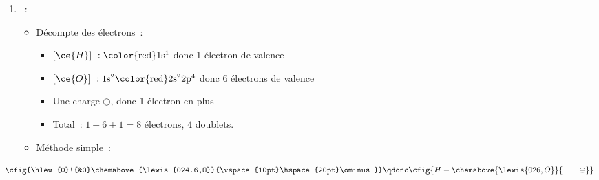 \documentclass[a4paper, 12pt, final, garamond]{book}
\begin{document}
\begin{enumerate}
    \item[]
        \begin{itemize}[label=$\diamond$, leftmargin=10pt]
            ~:
                \begin{itemize}[label=$\triangleright$, leftmargin=20pt]
                    \item Décompte des électrons~:
                        \begin{itemize}[label=$\ra$, leftmargin=20pt]
                            \item $[\ce{H}]~: \rm \color{red}1s^1$
                                donc 1 électron de valence
                            \item $[\ce{O}]~: \rm 1s^2\color{red}2s^22p^4$
                                donc 6 électrons de valence
                            \item Une charge $\ominus$, donc 1 électron en plus
                            \item Total~: $1 + 6 + 1 = 8$ électrons, 4
                                doublets.
                        \end{itemize}
                    \item Méthode simple~:
                \end{itemize}
        \end{itemize}
\end{enumerate}
\[
    \cfig{\hlew{0}!{&0}\chemabove{\lewis{024.6,O}}{\vspace{10pt}\hspace{20pt}\ominus}}
    \qdonc
    \cfig{H-\chemabove{\lewis{026,O}}{\vspace{10pt}\hspace{20pt}\ominus}}
\]
\end{document}
